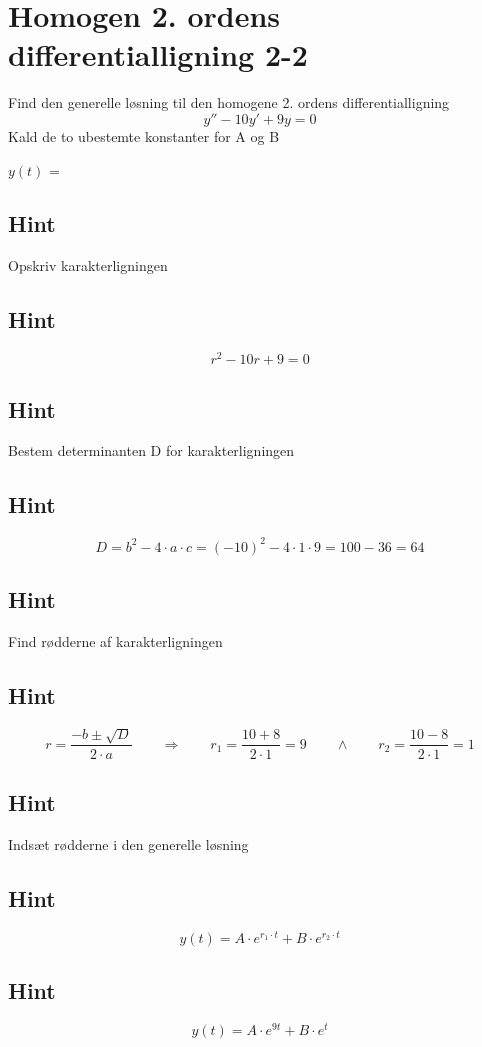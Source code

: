 \documentclass{article}
\newenvironment{exercise}[1]{\newpage\section{#1}}{}
\newcommand{\answerbox}[1]{\fbox{$#1$}}
\newcommand{\hint}{\subsection*{Hint}}
\begin{document}
\begin{exercise}{Homogen 2. ordens differentialligning 2-2}
	
	Find den generelle løsning til den homogene 2. ordens differentialligning
\[
y'' - 10y' + 9y = 0
\]
Kald de to ubestemte konstanter for A og B

$y(t)$ = \answerbox{ A \cdot e^{9t} + B \cdot e^{t}}


\hint 

Opskriv karakterligningen

\hint

\[
r^2 -10r + 9 = 0
\]


\hint

Bestem determinanten D for karakterligningen


\hint 
\[
D = b^2 - 4 \cdot a \cdot c = (-10)^2 - 4 \cdot 1 \cdot 9  = 100 - 36 = 64
\]

\hint 
Find rødderne af karakterligningen


\hint

\[
r = \frac{-b \pm \sqrt{D}}{2 \cdot a} \qquad  \Rightarrow \qquad r_1 = \frac{10 + 8}{2 \cdot 1} = 9 \qquad \wedge \qquad r_2 = \frac{10 - 8}{2 \cdot 1} = 1
\]

\hint

Indsæt rødderne i den generelle løsning

\hint
\[
y(t) = A \cdot e^{r_1 \cdot t} + B \cdot e^{r_2\cdot t}
\]

\hint

\[
y(t) = A \cdot e^{9t} + B \cdot e^{t}
\]
	
\end{exercise}

\newpage
\end{document}
